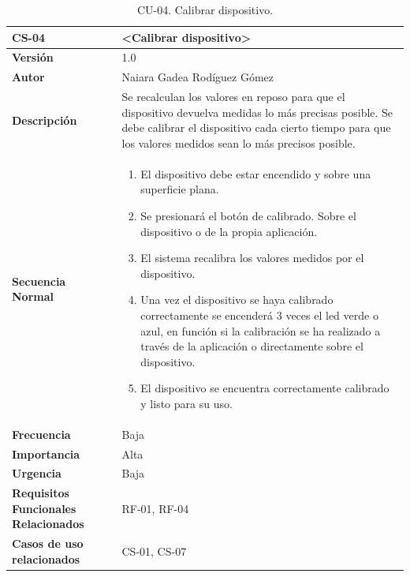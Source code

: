 \begin{table}[h!]
\centering
\begin{tabular}{ |m{3cm}|m{11cm}|  } 
\hline
\cellcolor[HTML]{B9E3F0}\textbf{CS-04} & \cellcolor[HTML]{B9E3F0}\textbf{<Calibrar dispositivo>}\\

\hline
\cellcolor[HTML]{EFEFEF}\textbf{Versión}             & 1.0  \\
\hline
\cellcolor[HTML]{EFEFEF}\textbf{Autor}                & Naiara Gadea Rodíguez Gómez\\
\hline
\cellcolor[HTML]{EFEFEF}\textbf{Descripción}                & {Se recalculan los valores en reposo para que el dispositivo devuelva medidas lo más precisas posible. Se debe calibrar el dispositivo cada cierto tiempo para que los valores medidos sean lo más precisos posible.}\\
\hline
\cellcolor[HTML]{EFEFEF}\textbf{Secuencia \newline Normal}                &                 
        \begin{enumerate}
			\def\labelenumi{\arabic{enumi}.}
			\tightlist
			\item El dispositivo debe estar encendido y sobre una superficie plana.
			\item Se presionará el botón de calibrado. Sobre el dispositivo o de la propia aplicación. 
                \item El sistema recalibra los valores medidos por el dispositivo.
                \item Una vez el dispositivo se haya calibrado correctamente se encenderá 3 veces el led verde o azul, en función si la calibración se ha realizado a través de la aplicación o directamente sobre el dispositivo. 
                \item El dispositivo se encuentra correctamente calibrado y listo para su uso. 
		\end{enumerate}\\
\hline
\cellcolor[HTML]{EFEFEF}\textbf{Frecuencia}                & Baja\\
\hline
\cellcolor[HTML]{EFEFEF}\textbf{Importancia}                & Alta\\
\hline
\cellcolor[HTML]{EFEFEF}\textbf{Urgencia}                & Baja\\
\hline
\cellcolor[HTML]{EFEFEF}\textbf{Requisitos Funcionales Relacionados}                & {RF-01, RF-04}\\
\hline
\cellcolor[HTML]{EFEFEF}\textbf{Casos de uso relacionados}                & {CS-01, CS-07}\\
\hline
\end{tabular}
\caption{CU-04. Calibrar dispositivo.}
\end{table}

